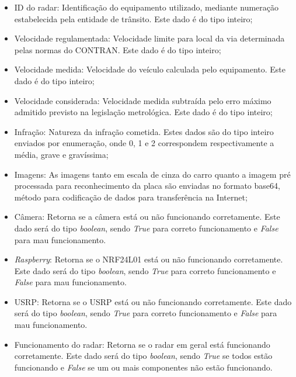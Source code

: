     \begin{itemize}
        \item ID do radar: Identificação do equipamento utilizado, mediante numeração estabelecida pela entidade de trânsito. Este dado é do tipo inteiro;
        \item Velocidade regulamentada: Velocidade limite para  local da via determinada pelas normas do CONTRAN\cite{contranVI}. Este dado é do tipo inteiro;
        \item Velocidade medida: Velocidade  do veículo calculada pelo equipamento. Este dado é do tipo inteiro;
        \item Velocidade considerada: Velocidade medida subtraída pelo erro máximo admitido previsto na legislação metrológica. Este dado é do tipo inteiro;
        \item Infração: Natureza da infração cometida. Estes dados são do tipo inteiro enviados por enumeração, onde 0, 1 e 2 correspondem respectivamente a média, grave e gravíssima;
        \item Imagens: As imagens tanto em escala de cinza do carro quanto a imagem pré processada para reconhecimento da placa são enviadas no formato base64, método para codificação de dados para transferência na Internet;
        \item Câmera: Retorna se a câmera está ou não funcionando corretamente. Este dado será do tipo \emph{boolean}, sendo \emph{True} para correto funcionamento e \emph{False} para mau funcionamento. 
        \item \emph{Raspberry}: Retorna se o NRF24L01 está ou não funcionando corretamente. Este dado será do tipo \emph{boolean}, sendo \emph{True} para correto funcionamento e \emph{False} para mau funcionamento.
        \item USRP: Retorna se o USRP está ou não funcionando corretamente.  Este dado será do tipo \emph{boolean}, sendo \emph{True} para correto funcionamento e \emph{False} para mau funcionamento.
        \item Funcionamento do radar: Retorna se o radar em geral está funcionando corretamente. Este dado será do tipo \emph{boolean}, sendo \emph{True} se todos estão funcionando e \emph{False} se um ou mais componentes não estão funcionando.
        \end{itemize} 
        
